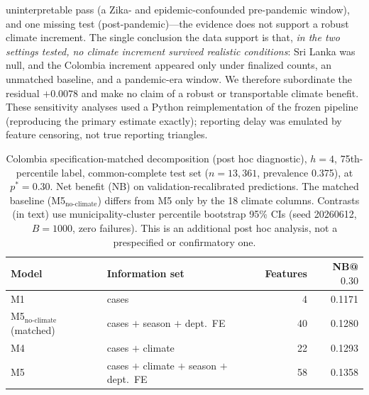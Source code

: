 \documentclass[11pt,a4paper]{article}
\begin{document}
uninterpretable pass (a Zika- and epidemic-confounded pre-pandemic window), and one missing test (post-pandemic)---the evidence does not support a robust climate increment. The single conclusion the data support is that, \emph{in the two settings tested, no climate increment survived realistic conditions}: Sri Lanka was null, and the Colombia increment appeared only under finalized counts, an unmatched baseline, and a pandemic-era window. We therefore subordinate the residual $+0.0078$ and make no claim of a robust or transportable climate benefit. These sensitivity analyses used a Python reimplementation of the frozen pipeline (reproducing the primary estimate exactly); reporting delay was emulated by feature censoring, not true reporting triangles.

\begin{table}[H]
\centering
\caption{Colombia specification-matched decomposition (post hoc diagnostic), $h=4$, 75th-percentile label, common-complete test set ($n=13{,}361$, prevalence 0.375), at $p^*=0.30$. Net benefit (NB) on validation-recalibrated predictions. The matched baseline (M5$_{\text{no-climate}}$) differs from M5 only by the 18 climate columns. Contrasts (in text) use municipality-cluster percentile bootstrap 95\% CIs (seed 20260612, $B=1000$, zero failures). This is an additional post hoc analysis, not a prespecified or confirmatory one.}
\label{tab:matcheddecomp}
\begin{tabular}{llrr}
\toprule
Model & Information set & Features & NB@$0.30$ \\
\midrule
M1 & cases & 4 & 0.1171 \\
M5$_{\text{no-climate}}$ (matched) & cases $+$ season $+$ dept.\ FE & 40 & 0.1280 \\
M4 & cases $+$ climate & 22 & 0.1293 \\
M5 & cases $+$ climate $+$ season $+$ dept.\ FE & 58 & 0.1358 \\
\bottomrule
\end{tabular}
\end{table}
\end{document}
